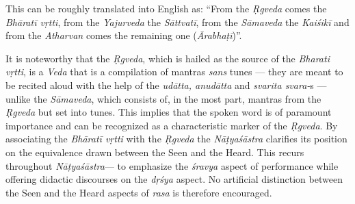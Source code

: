 This can be roughly translated into English as: “From the \textsl{Ṛgveda} comes the \textsl{Bhāratī vṛtti}, from the \textsl{Yajurveda} the \textsl{Sāttvatī}, from the \textsl{Sāmaveda} the \textsl{Kaiśikī} and from the \textsl{Atharvan} comes the remaining one (\textsl{Ārabhaṭī})”. 

It is noteworthy that the \textsl{Ṛgveda}, which is hailed as the source of the \textsl{Bharati vṛtti}, is a \textsl{Veda} that is a compilation of mantras \textsl{sans} tunes --- they are meant to be recited aloud with the help of the \textsl{udātta, anudātta} and \textsl{svarita svara-}s --- unlike the \textsl{Sāmaveda}, which consists of, in the most part, mantras from the \textsl{Ṛgveda} but set into tunes. This implies that the spoken word is of paramount importance and can be recognized as a characteristic marker of the \textsl{Ṛgveda}. By associating the \textsl{Bhāratī vṛtti} with the \textsl{Ṛgveda}  the \textsl{Nāṭyaśāstra} clarifies its position on the equivalence drawn between the Seen and the Heard. This recurs throughout \textsl{Nāṭyaśāstra}--- to emphasize the \textsl{śravya} aspect of performance while offering didactic discourses on the \textsl{dṛśya} aspect. No artificial distinction between the Seen and the Heard aspects of \textsl{rasa} is therefore encouraged.

